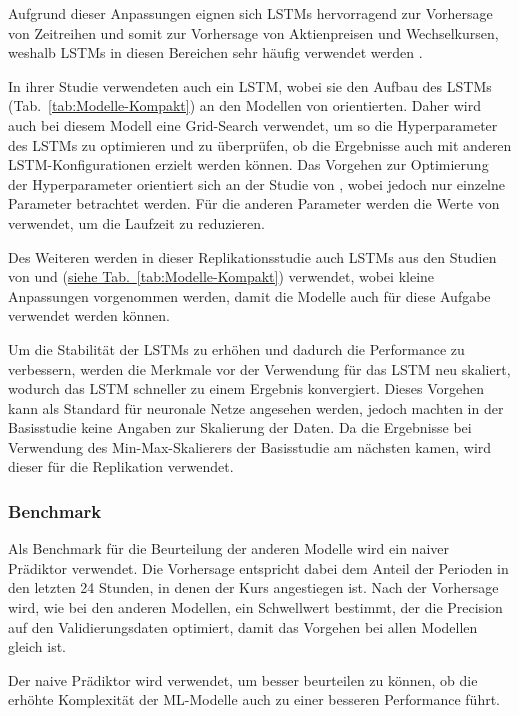 \documentclass[a4paper, 12pt]{article}
\begin{document}
Aufgrund dieser Anpassungen eignen sich LSTMs hervorragend zur Vorhersage von Zeitreihen und somit zur Vorhersage von Aktienpreisen und Wechselkursen, weshalb LSTMs in diesen Bereichen sehr häufig verwendet werden \parencite{AyiteyJunior2023}.
\vspace{\baselineskip}

In ihrer Studie verwendeten \citeauthor{Goutte2023} auch ein LSTM, wobei sie den Aufbau des LSTMs (Tab.~\ref{tab:Modelle-Kompakt}) an den Modellen von \textcite{Ghoshal2020} orientierten.
Daher wird auch bei diesem Modell eine Grid-Search verwendet, um so die Hyperparameter des LSTMs zu optimieren und zu überprüfen, ob die Ergebnisse auch mit anderen LSTM-Konfigurationen erzielt werden können.
Das Vorgehen zur Optimierung der Hyperparameter orientiert sich an der Studie von \textcite{Jakubik2023}, wobei jedoch nur einzelne Parameter betrachtet werden.
Für die anderen Parameter werden die Werte von \textcite{Goutte2023} verwendet, um die Laufzeit zu reduzieren.

Des Weiteren werden in dieser Replikationsstudie auch LSTMs aus den Studien von \textcite{He2024} und \textcite{Berger2024} (\hyperref[tab:Modelle-Kompakt]{siehe Tab.~\ref*{tab:Modelle-Kompakt}}) verwendet, wobei kleine Anpassungen vorgenommen werden, damit die Modelle auch für diese Aufgabe verwendet werden können.

Um die Stabilität der LSTMs zu erhöhen und dadurch die Performance zu verbessern, werden die Merkmale vor der Verwendung für das LSTM neu skaliert, wodurch das LSTM schneller zu einem Ergebnis konvergiert.
Dieses Vorgehen kann als Standard für neuronale Netze angesehen werden, jedoch machten \textcite{Goutte2023} in der Basisstudie keine Angaben zur Skalierung der Daten.
Da die Ergebnisse bei Verwendung des Min-Max-Skalierers der Basisstudie am nächsten kamen, wird dieser für die Replikation verwendet.

\subsubsection{Benchmark}
Als Benchmark für die Beurteilung der anderen Modelle wird ein naiver Prädiktor verwendet.
Die Vorhersage entspricht dabei dem Anteil der Perioden in den letzten 24 Stunden, in denen der Kurs angestiegen ist.
Nach der Vorhersage wird, wie bei den anderen Modellen, ein Schwellwert bestimmt, der die Precision auf den Validierungsdaten optimiert, damit das Vorgehen bei allen Modellen gleich ist.

Der naive Prädiktor wird verwendet, um besser beurteilen zu können, ob die erhöhte Komplexität der ML-Modelle auch zu einer besseren Performance führt.
\end{document}
